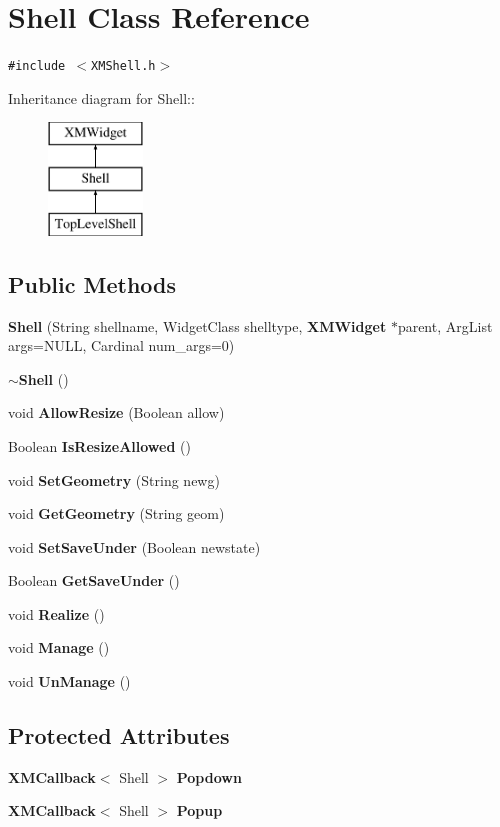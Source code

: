 \section{Shell  Class Reference}
\label{classShell}
{\tt \#include $<$XMShell.h$>$}

Inheritance diagram for Shell::\begin{figure}[H]
\begin{center}
\leavevmode
\includegraphics[height=3cm]{classShell}
\end{center}
\end{figure}
\subsection*{Public Methods}
\begin{CompactItemize}
\item 
{\bf Shell} (String shellname, Widget\-Class shelltype, {\bf XMWidget} $\ast$parent, Arg\-List args=NULL, Cardinal num\_\-args=0)
\item 
{\bf $\sim$Shell} ()
\item 
void {\bf Allow\-Resize} (Boolean allow)
\item 
Boolean {\bf Is\-Resize\-Allowed} ()
\item 
void {\bf Set\-Geometry} (String newg)
\item 
void {\bf Get\-Geometry} (String geom)
\item 
void {\bf Set\-Save\-Under} (Boolean newstate)
\item 
Boolean {\bf Get\-Save\-Under} ()
\item 
void {\bf Realize} ()
\item 
void {\bf Manage} ()
\item 
void {\bf Un\-Manage} ()
\end{CompactItemize}
\subsection*{Protected Attributes}
\begin{CompactItemize}
\item 
{\bf XMCallback}$<$ Shell $>$ {\bf Popdown}
\item 
{\bf XMCallback}$<$ Shell $>$ {\bf Popup}
\end{CompactItemize}
